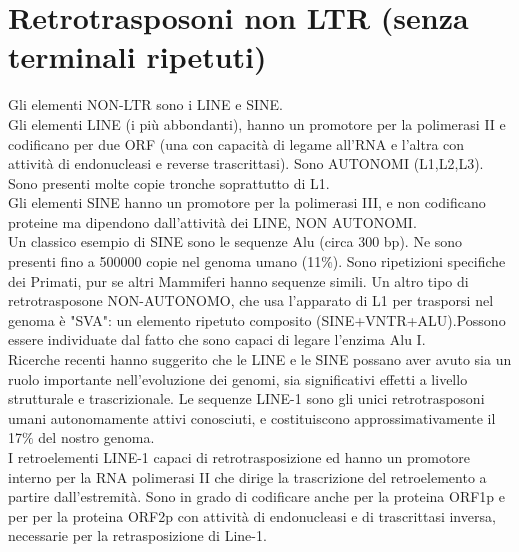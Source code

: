 \documentclass{article}
\begin{document}
\section{Retrotrasposoni non LTR (senza terminali ripetuti)}
Gli elementi NON-LTR sono i LINE e SINE.\\
Gli elementi LINE (i più abbondanti), hanno un promotore per la polimerasi II e codificano per due ORF (una con capacità di
legame all'RNA e l'altra con attività di endonucleasi e reverse trascrittasi). Sono AUTONOMI (L1,L2,L3). Sono presenti
molte copie tronche soprattutto di L1.\\
Gli elementi SINE hanno un promotore per la polimerasi III, e non codificano proteine ma dipendono dall'attività dei LINE,
NON AUTONOMI.\\
Un classico esempio di SINE sono le sequenze Alu (circa 300 bp). Ne sono presenti fino a 500000 copie nel genoma umano
(11$\%$). Sono ripetizioni specifiche dei Primati, pur se altri Mammiferi hanno sequenze simili.
Un altro tipo di retrotrasposone NON-AUTONOMO, che usa l'apparato di L1 per trasporsi nel genoma è "SVA": un elemento
ripetuto composito (SINE+VNTR+ALU).Possono essere individuate dal fatto che sono capaci di legare l'enzima Alu I.\\
Ricerche recenti hanno suggerito che le LINE e le SINE possano aver avuto sia un ruolo importante
nell'evoluzione dei genomi, sia significativi effetti a livello strutturale e trascrizionale.
Le sequenze LINE-1 sono gli unici retrotrasposoni umani autonomamente attivi conosciuti,
e costituiscono approssimativamente il 17$\%$ del nostro genoma.\\
I retroelementi LINE-1 capaci di retrotrasposizione ed hanno un promotore interno per la
RNA polimerasi II che dirige la trascrizione del retroelemento a partire dall'estremità. Sono
in grado di codificare anche per la proteina ORF1p e per per la proteina ORF2p con
attività di endonucleasi e di trascrittasi inversa, necessarie per la retrasposizione di Line-1.
\end{document}
